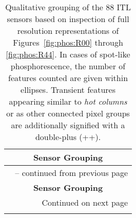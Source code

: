 \begin{center}
\begin{longtable}{lll}
\caption[Qualitative grouping of ITL sensors]{
    Qualitative grouping of the 88 ITL sensors based on inspection of full resolution representations 
    of Figures~\ref{fig:phos:R00} through \ref{fig:phos:R44}. In cases of spot-like phosphorescence, 
    the number of features counted are given within ellipses. Transient features appearing similar to 
    \textit{hot columns} or as other connected pixel groups are additionally signified with a double-plus (++).
} \label{qualitative_assessment:itl_sensors} \\
\toprule
\multicolumn{3}{c}{\textbf{Sensor Grouping}} \\
\midrule
\endfirsthead

\multicolumn{3}{c}{{\tablename\ \thetable{} -- continued from previous page}} \\
\toprule
\multicolumn{3}{c}{\textbf{Sensor Grouping}} \\
\midrule
\endhead

\midrule
\multicolumn{3}{r}{{Continued on next page}} \\
\bottomrule
\endfoot

\bottomrule
\endlastfoot


\end{longtable}
\end{center}
